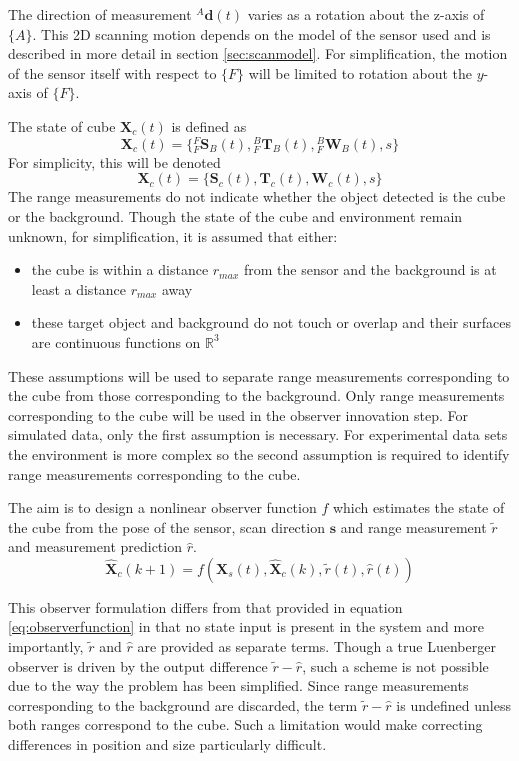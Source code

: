 The direction of measurement ${^{A}\mathbf{d}(t)}$ varies as a rotation about the z-axis of $\{A\}$. This 2D scanning motion depends on the model of the sensor used and is described in more detail in section \ref{sec:scanmodel}. For simplification, the motion of the sensor itself with respect to $\{F\}$ will be limited to rotation about the $y$-axis of $\{F\}$.

The state of cube $\mathbf{X}_{c}(t)$ is defined as 
\begin{equation}
	\mathbf{X}_{c}(t) = 
	\{{^{F}_{F}\mathbf{S}^{}_{B}(t)},{^{B}_{F}\mathbf{T}^{}_{B}(t)},{^{B}_{F}\mathbf{W}^{}_{B}(t)},
	s\}
\end{equation}
For simplicity, this will be denoted
\begin{equation}
	\mathbf{X}_{c}(t) = 
	\{\mathbf{S}_{c}(t),\mathbf{T}_{c}(t),\mathbf{W}_{c}(t),s\}
\end{equation}
The range measurements do not indicate whether the object detected is the cube or the background. Though the state of the cube and environment remain unknown, for simplification, it is assumed that either:
\begin{itemize}
\item the cube is within a distance $r_{max}$ from the sensor and the background is at least a distance $r_{max}$ away
\item these target object and background do not touch or overlap and their surfaces are continuous functions on $\mathbb{R}^3$
\end{itemize}
These assumptions will be used to separate range measurements corresponding to the cube from those corresponding to the background. Only range measurements corresponding to the cube will be used in the observer innovation step. For simulated data, only the first assumption is necessary. For experimental data sets the environment is more complex so the second assumption is required to identify range measurements corresponding to the cube. 

The aim is to design a nonlinear observer function $f$ which estimates the state of the cube from the pose of the sensor, scan direction $\mathbf{s}$ and range measurement $\tilde{r}$ and measurement prediction $\hat{r}$.
\begin{equation}
	\hat{\mathbf{X}}_{c}(k+1) = f(\mathbf{X}_{s}(t),\hat{\mathbf{X}}_{c}(k),\tilde{r}(t),\hat{r}(t))
\end{equation}

This observer formulation differs from that provided in equation \ref{eq:observerfunction} in that no state input is present in the system and more importantly, $\tilde{r}$ and $\hat{r}$ are provided as separate terms. Though a true Luenberger observer is driven by the output difference $\tilde{r} - \hat{r}$, such a scheme is not possible due to the way the problem has been simplified. Since range measurements corresponding to the background are discarded, the term $\tilde{r} - \hat{r}$ is undefined unless both ranges correspond to the cube. Such a limitation would make correcting differences in position and size particularly difficult.

